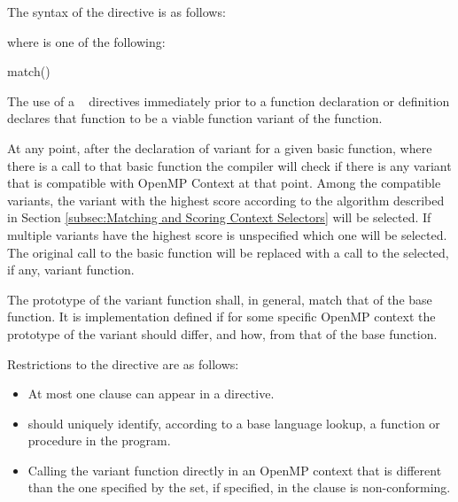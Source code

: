 \begin{itemize}
\begin{itemize}
\begin{fortranspecific}
The syntax of the  directive is as follows:

\begin{ompfPragma}
!$omp declare variant(\plc{proc-name}:\plc{base-proc-name}) [clause[ [},\plc{] clause] ... ]}
\end{ompfPragma}

where  is one of the following{}:

\begin{indentedcodelist}
match()
\end{indentedcodelist}
\end{fortranspecific}

\descr

The use of a ~ directives immediately prior to a function declaration or definition declares that function to be a viable function variant of the  function. 

At any point, after the declaration of variant for a given basic function, where there is a call to that basic function the compiler will check if there is any variant that is compatible with OpenMP Context at that point. Among the compatible variants, the variant with the highest score according to the algorithm described in Section \ref{subsec:Matching and Scoring Context Selectors} will be selected. If multiple variants have the highest score is unspecified which one will be selected. The original call to the basic function will be replaced with a call to the selected, if any, variant function. 

The prototype of the variant function shall, in general, match that of the base function. It is implementation defined if for some specific OpenMP context the prototype of the variant should differ, and how, from that of the base function.

\restrictions
Restrictions to the  directive are as follows:

\begin{itemize}
\item At most one  clause can appear in a  directive.
\item {} should uniquely identify, according to a base language lookup, a function or procedure in the program.
\item Calling the variant function directly in an OpenMP context that is different than the one specified by the  set, if specified, in the  clause is non-conforming.


\end{itemize}
\end{itemize}
\end{itemize}
